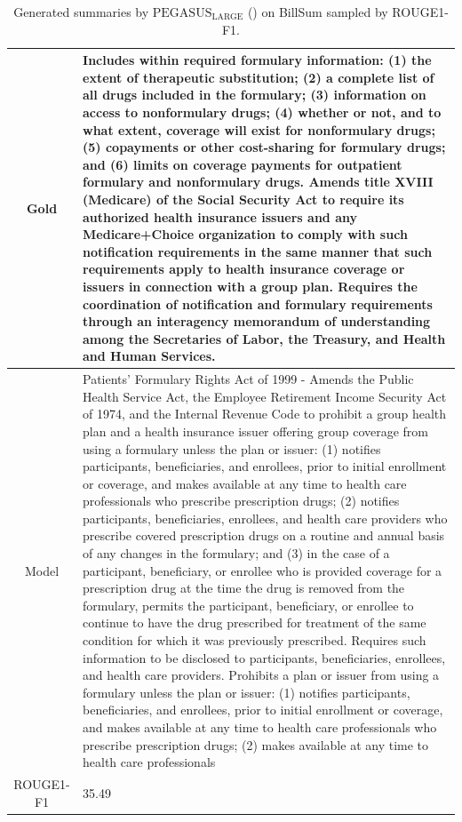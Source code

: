 \begin{table}[bth!]
\begin{tabular}{c|p{}}
\\ \hline
Gold & 
Includes within required formulary information: (1) the extent of therapeutic substitution; (2) a complete list of all drugs included in the formulary; (3) information on access to nonformulary drugs; (4) whether or not, and to what extent, coverage will exist for nonformulary drugs; (5) copayments or other cost-sharing for formulary drugs; and (6) limits on coverage payments for outpatient formulary and nonformulary drugs. Amends title XVIII (Medicare) of the Social Security Act to require its authorized health insurance issuers and any Medicare+Choice organization to comply with such notification requirements in the same manner that such requirements apply to health insurance coverage or issuers in connection with a group plan. Requires the coordination of notification and formulary requirements through an interagency memorandum of understanding among the Secretaries of Labor, the Treasury, and Health and Human Services.
\\ \hline
Model & 
Patients' Formulary Rights Act of 1999 - Amends the Public Health Service Act, the Employee Retirement Income Security Act of 1974, and the Internal Revenue Code to prohibit a group health plan and a health insurance issuer offering group coverage from using a formulary unless the plan or issuer: (1) notifies participants, beneficiaries, and enrollees, prior to initial enrollment or coverage, and makes available at any time to health care professionals who prescribe prescription drugs; (2) notifies participants, beneficiaries, enrollees, and health care providers who prescribe covered prescription drugs on a routine and annual basis of any changes in the formulary; and (3) in the case of a participant, beneficiary, or enrollee who is provided coverage for a prescription drug at the time the drug is removed from the formulary, permits the participant, beneficiary, or enrollee to continue to have the drug prescribed for treatment of the same condition for which it was previously prescribed. Requires such information to be disclosed to participants, beneficiaries, enrollees, and health care providers. Prohibits a plan or issuer from using a formulary unless the plan or issuer: (1) notifies participants, beneficiaries, and enrollees, prior to initial enrollment or coverage, and makes available at any time to health care professionals who prescribe prescription drugs; (2) makes available at any time to health care professionals
\\ \hline
ROUGE1-F1 & 
35.49
\\ \hline
\end{tabular}
\caption{Generated summaries by $\text{PEGASUS}_{\text{LARGE}}$ (\gnews) on BillSum sampled by ROUGE1-F1.}
\end{table}
